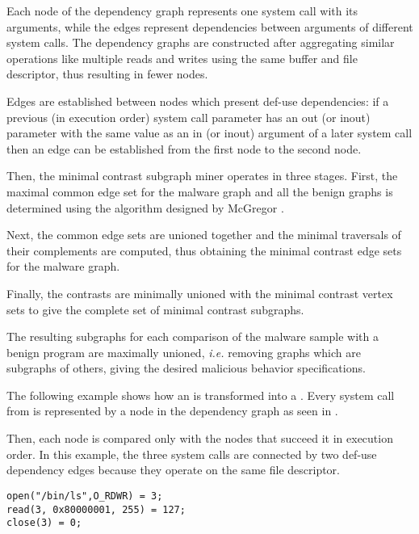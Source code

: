 Each node of the dependency graph represents one system call with its arguments, while the edges represent dependencies between arguments of different system calls. The dependency graphs are constructed after aggregating similar operations like multiple reads and writes using the same buffer and file descriptor, thus resulting in fewer nodes.

Edges are established between nodes which present def-use dependencies: if a previous (in execution order) system call parameter has an out (or inout) parameter with the same value as an in (or inout) argument of a later system call then an edge can be established from the first node to the second node.

Then, the minimal contrast subgraph miner operates in three stages. First, the maximal common edge set for the malware graph and all the benign graphs is determined using the algorithm designed by McGregor \cite{common-subgraph}. 

Next, the common edge sets are unioned together and the minimal traversals of their complements are computed, thus obtaining the minimal contrast edge sets for the malware graph.

Finally, the contrasts are minimally unioned with the minimal contrast vertex sets to give the complete set of minimal contrast subgraphs.

The resulting subgraphs for each comparison of the malware sample with a benign program are maximally unioned, \textit{i.e.} removing graphs which are subgraphs of others, giving the desired malicious behavior specifications.

The following example shows how an  is transformed into a . Every system call from  is represented by a node in the dependency graph as seen in . 

Then, each node is compared only with the nodes that succeed it in execution order. In this example, the three system calls are connected by two def-use dependency edges because they operate on the same file descriptor.

\lstset{language=C,caption=System call trace,label=lst:syscall-trace}
\begin{lstlisting}
open("/bin/ls",O_RDWR) = 3;
read(3, 0x80000001, 255) = 127;
close(3) = 0;
\end{lstlisting}

